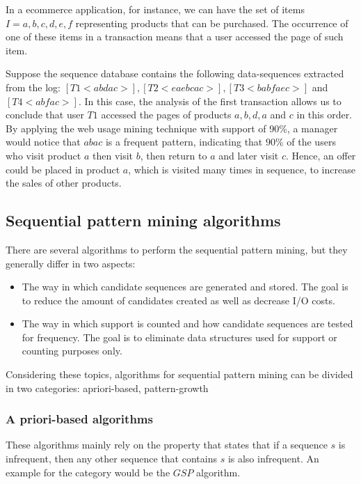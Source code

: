 In a ecommerce application, for instance, we can have the set of items $I = {a, b, c, d, e, f}$ representing products that can be purchased. The occurrence of one of these items in a transaction means that a user accessed the page of such item.

Suppose the sequence database contains the following data-sequences extracted from the log: $[T1 <abdac>], [T2 <eaebcac>], [T3 <babfaec>]$ and $[T4 <abfac>]$. In this case, the analysis of the first transaction allows us to conclude that user $T1$ accessed the pages of products $a,b,d,a$ and $c$ in this order. By applying the web usage mining technique with support of 90\%, a manager would notice that $abac$ is a frequent pattern, indicating that $90\%$ of the users who visit product $a$ then visit $b$, then return to $a$ and later visit $c$. Hence, an offer could be placed in product $a$, which is visited many times in sequence, to increase the sales of other products. 


\subsection{Sequential pattern mining algorithms}

There are several algorithms to perform the sequential pattern mining, but they generally differ in two aspects\cite{Nizar}:

\begin{itemize}

\item The way in which candidate sequences are generated and stored. The goal is to reduce the amount of candidates created as well as decrease I/O costs.

\item The way in which support is counted and how candidate sequences are tested for frequency. The goal is to eliminate data structures used for support or counting purposes only.

\end{itemize}

Considering these topics, algorithms for sequential pattern mining can be divided in two categories: apriori-based, pattern-growth

\subsubsection{A priori-based algorithms}

These algorithms mainly rely on the property that states that if a sequence $s$ is infrequent, then any other sequence that contains $s$ is also infrequent. An example for the category would be the $GSP$\cite{Rakesh} algorithm.

